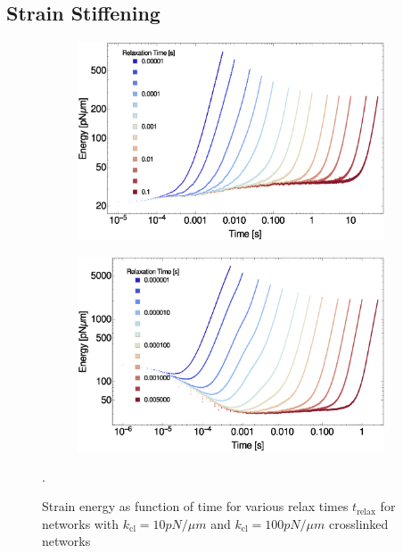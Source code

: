 \documentclass[11pt]{article}
\begin{document}
\subsection{Strain Stiffening} \label{strain_supp} 
\begin{figure}[H] 
  \begin{subfigure}{0.35\textwidth}
    \centering
    \includegraphics[width=\textwidth]{figs/elasticity/eng_vs_t_k10.eps}
    \caption{\label{fig:tRelax10}}
  \end{subfigure}
  \begin{subfigure}{0.35\textwidth}
    \centering
    \includegraphics[width=\textwidth]{figs/elasticity/eng_vs_t_k100.eps}
    \caption{\label{fig:tRelax100}}
  \end{subfigure}
  \label{fig:tRelax}
  \caption{Strain energy as function of time for various relax times $t_\text{relax}$ for networks with 
   $k_\text{cl}=10pN/\mu m$ and $k_\text{cl}=100pN/\mu m$  
crosslinked networks}.
\end{figure}
\end{document}
